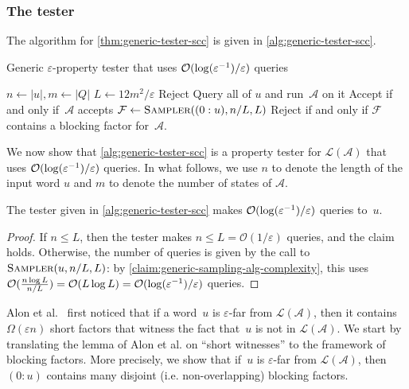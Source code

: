 \documentclass[letterpaper, USenglish, cleveref, autoref, thm-restate, numberwithinsect]{lipics-v2021}
\theoremstyle{theorem}
\theoremstyle{definition}
\newcommand{\Aa}{\mathcal{A}}
\newcommand{\cO}{\mathcal{O}}
\newcommand{\eps}{\varepsilon}
\newcommand{\Ff}{\mathcal{F}}
\newcommand{\lang}[1]{\mathcal{L}(#1)}
\newcommand{\timedword}[2]{(#1:#2)}
\newcommand{\twu}{\timedword{0}{u}}
\newcommand{\epslogeps}[1][]
{\ifthenelse{\equal{#1}{}}{\log(\eps^{-1})/\eps}{\log^{ #1 }(\eps^{-1})/\eps}}
\begin{document}
\subsubsection{The tester}

The algorithm for \cref{thm:generic-tester-scc} is given in \cref{alg:generic-tester-scc}.

\begin{algorithm}[htbp]
\caption{Generic $\eps$-property tester that uses $\cO(\epslogeps)$ queries}\label{alg:generic-tester-scc}
\begin{algorithmic}[1] \Function{Tester}{$u, \eps$}
\State $n \gets |u|, m\gets |Q|$
\State $L \gets 12m^2/\eps$
\If{$\lang{\Aa} \cap \Sigma^n = \emptyset$}
    \State Reject
    \State Query all of $u$ and run~$\Aa$ on it
    \State Accept if and only if~$\Aa$ accepts
\Else \label{line:intersting-case}
    \State \label{line:compute-f}$\Ff \gets\Call{Sampler}{\twu, n/L, L}$
    \State Reject if and only if $\Ff$ contains a blocking factor for~$\Aa$.
\EndIf
\EndFunction
\end{algorithmic}
\end{algorithm}

We now show that \cref{alg:generic-tester-scc} is a property tester for $\lang{\Aa}$ that uses $\cO(\epslogeps)$ queries. In what follows, we use $n$ to denote the length of the input word $u$ and $m$ to denote the number of states of $\Aa$.
\begin{claim}
    The tester given in \cref{alg:generic-tester-scc} makes $\cO(\epslogeps)$ queries to~$u$.
\end{claim}
\begin{proof}
    If $n \le L$, then the tester makes $n \le L =\cO(1/\eps)$ queries, and the claim holds.
    Otherwise, the number of queries is given by the call to $\Call{Sampler}{u, n/L, L}$:
    by \cref{claim:generic-sampling-alg-complexity}, this uses $\cO(\frac{n \log L}{n/L}) = \cO(L \log L) = \cO(\epslogeps)$ queries.
\end{proof}

Alon et al.~\cite[Lemma 2.6]{alon2001regular} first noticed that if a word~$u$ is $\eps$-far from $\lang{\Aa}$, then it contains $\Omega(\eps n)$ short factors that witness the fact that~$u$ is not in $\lang{\Aa}$.
We start by translating the lemma of Alon et al. on ``short witnesses'' to the framework of blocking factors.
More precisely, we show that if~$u$ is $\eps$-far from $\lang{\Aa}$, then $\twu$ contains many disjoint (i.e. non-overlapping) blocking factors.
\end{document}

